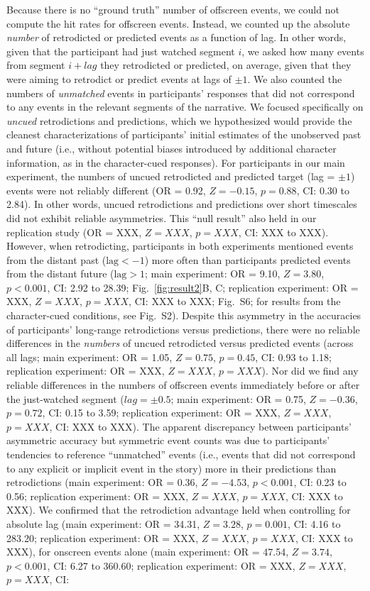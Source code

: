 \documentclass[10pt]{article}
\newcommand{\events}{S2}
\newcommand{\hitRates}{S6}
\begin{document}
Because there is no ``ground truth'' number of offscreen events, we could not compute the hit rates for offscreen events. Instead, we counted up the absolute \textit{number} of retrodicted or predicted events as a function of lag. In other words, given that the participant had just watched segment $i$, we asked how many events from segment $i + lag$ they retrodicted or predicted, on average, given that they were aiming to retrodict or predict events at lags of $\pm 1$. We also counted the numbers of \textit{unmatched} events in participants' responses that did not correspond to any events in the relevant segments of the narrative. We focused specifically on \textit{uncued} retrodictions and predictions, which we hypothesized would provide the cleanest characterizations of participants' initial estimates of the unobserved past and future (i.e., without potential biases introduced by additional character information, as in the character-cued responses). For participants in our main experiment, the numbers of uncued retrodicted and predicted target (lag = $\pm 1$) events were not reliably different (OR = 0.92, $Z = -0.15$, $p = 0.88$, CI: 0.30 to 2.84). In other words, uncued retrodictions and predictions over short timescales did not exhibit reliable asymmetries. This ``null result'' also held in our replication study (OR = XXX, $Z = XXX$, $p = XXX$, CI: XXX to XXX). However, when retrodicting, participants in both experiments mentioned events from the distant past ($\mathrm{lag} < -1$) more often than participants predicted events from the distant future ($\mathrm{lag} > 1$; main experiment: OR = 9.10, $Z = 3.80$, $p < 0.001$, CI: 2.92 to 28.39; Fig.~\ref{fig:result2}B, C; replication experiment: OR = XXX, $Z = XXX$, $p = XXX$, CI: XXX to XXX; Fig.~\hitRates; for results from the character-cued conditions, see Fig.~\events). Despite this asymmetry in the accuracies of participants' long-range retrodictions versus predictions, there were no reliable differences in the \textit{numbers} of uncued retrodicted versus predicted events (across all lags; main experiment: OR = 1.05, $Z = 0.75$, $p = 0.45$, CI: 0.93 to 1.18; replication experiment: OR = XXX, $Z = XXX$, $p = XXX$). Nor did we find any reliable differences in the numbers of offscreen events immediately before or after the just-watched segment ($lag = \pm 0.5$; main experiment: OR = 0.75, $Z = -0.36$, $p = 0.72$, CI: 0.15 to 3.59; replication experiment: OR = XXX, $Z = XXX$, $p = XXX$, CI: XXX to XXX). The apparent discrepancy between participants' asymmetric accuracy but symmetric event counts was due to participants' tendencies to reference ``unmatched'' events (i.e., events that did not correspond to any explicit or implicit event in the story) more in their predictions than retrodictions (main experiment: OR = 0.36, $Z = -4.53$, $p < 0.001$, CI: 0.23 to 0.56; replication experiment: OR = XXX, $Z = XXX$, $p = XXX$, CI: XXX to XXX). We confirmed that the retrodiction advantage held when controlling for absolute lag (main experiment: OR = 34.31, $Z = 3.28$, $p = 0.001$, CI: 4.16 to 283.20; replication experiment: OR = XXX, $Z = XXX$, $p = XXX$, CI: XXX to XXX), for onscreen events alone (main experiment: OR = 47.54, $Z = 3.74$, $p < 0.001$, CI: 6.27 to 360.60; replication experiment: OR = XXX, $Z = XXX$, $p = XXX$, CI: 
\end{document}
